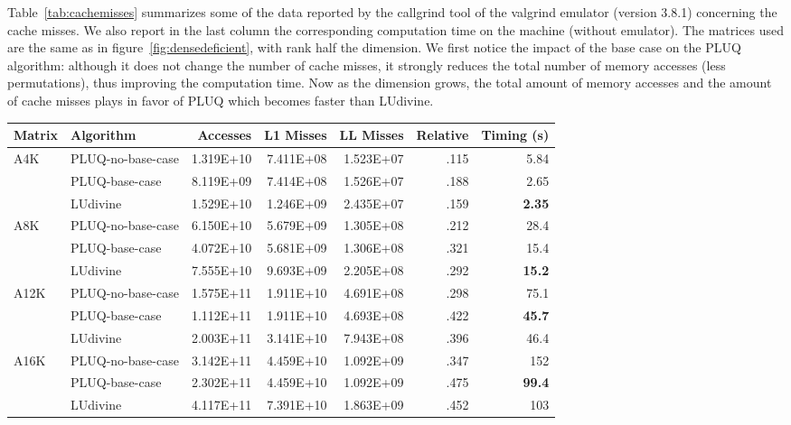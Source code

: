 \documentclass{article}
\begin{document}
Table~\ref{tab:cachemisses} summarizes some of the data reported by the callgrind tool
of the valgrind emulator (version 3.8.1) concerning the cache misses. We also
report in the last column the corresponding computation time on the machine (without emulator). 
The matrices used are the same as in figure~\ref{fig:densedeficient}, with
rank half the dimension.
We first  notice the impact of the base case on the PLUQ algorithm: although it
does not change the number of cache misses, it strongly reduces the total number
of memory accesses (less permutations), thus improving the computation time.
Now as the dimension grows, the total amount of memory accesses and
the amount of cache misses plays in favor of PLUQ which becomes faster
than LUdivine. 
\begin{table*}[htbp]
\begin{center}
\begin{tabular}{llrrrrr}
\toprule
 Matrix & Algorithm & Accesses & L1 Misses & LL Misses & Relative  & Timing (s) \\\midrule
\multirow{3}{*}{A4K} & PLUQ-no-base-case & 1.319E+10 & 7.411E+08 & 1.523E+07 & .115 & 5.84 \\& PLUQ-base-case & 8.119E+09 & 7.414E+08 & 1.526E+07 & .188 & 2.65 \\& LUdivine & 1.529E+10 & 1.246E+09 & 2.435E+07 & .159 & \textbf{2.35} \\\midrule
\multirow{3}{*}{A8K} & PLUQ-no-base-case & 6.150E+10 & 5.679E+09 & 1.305E+08 & .212 & 28.4\\
& PLUQ-base-case & 4.072E+10 & 5.681E+09 & 1.306E+08 & .321 & 15.4 \\& LUdivine & 7.555E+10 & 9.693E+09 & 2.205E+08 & .292 & \textbf{15.2}\\\midrule
\multirow{3}{*}{A12K} & PLUQ-no-base-case & 1.575E+11 & 1.911E+10 & 4.691E+08 & .298 & 75.1 \\
& PLUQ-base-case & 1.112E+11 & 1.911E+10 & 4.693E+08 & .422 & \textbf{45.7} \\& LUdivine & 2.003E+11 & 3.141E+10 & 7.943E+08 & .396 & 46.4\\\midrule
\multirow{3}{*}{A16K} & PLUQ-no-base-case & 3.142E+11 & 4.459E+10 & 1.092E+09 & .347 & 152 \\
 & PLUQ-base-case & 2.302E+11 & 4.459E+10 & 1.092E+09 & .475 & \textbf{99.4} \\& LUdivine & 4.117E+11 & 7.391E+10 & 1.863E+09 & .452 & 103 \\\bottomrule
\end{tabular}
\end{center}
\caption{Cache misses for dense matrices with rank equal half of the dimension}  
\label{tab:cachemisses} 
\end{table*}
\end{document}
